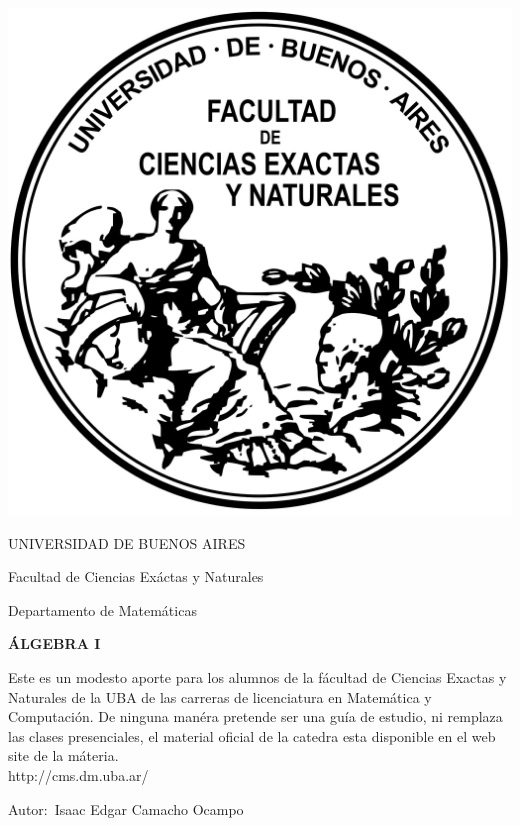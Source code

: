 \documentclass[12pt]{book}
\begin{document}
\thispagestyle{empty}

\begin {center}

\includegraphics[scale=.4]{Logo-fcenuba.png}

\medskip
UNIVERSIDAD DE BUENOS AIRES

Facultad de Ciencias Ex\'actas y Naturales

Departamento de Matem\'aticas


\vspace{3cm}


\textbf{\large ÁLGEBRA I}

\vspace{2cm}


Este es un modesto aporte para los alumnos de la f\'acultad de Ciencias Exactas y Naturales de la UBA de las carreras de licenciatura en Matemática y Computaci\'on.
De ninguna man\'era pretende ser una gu\'ia de estudio, ni remplaza las clases presenciales, el material oficial de la catedra esta disponible en el web site de la m\'ateria.
\\
http://cms.dm.uba.ar/

\end {center}


\vspace{2.5cm}

\noindent Autor:\,	Isaac Edgar Camacho Ocampo
 
\end{document}
